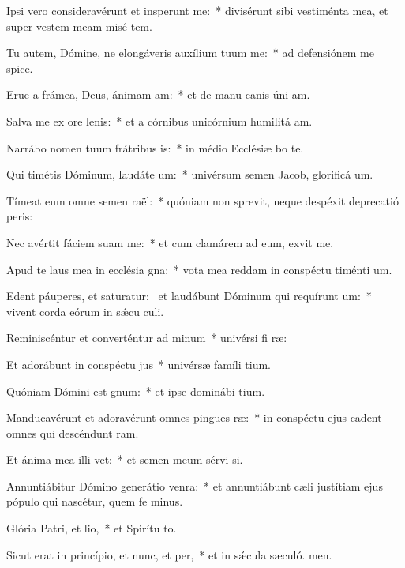 \item Ipsi vero consideravérunt et insperunt me:~* divisérunt sibi vestiménta mea, et super vestem meam misé tem.
\item Tu autem, Dómine, ne elongáveris auxílium tuum  me:~* ad defensiónem me spice.
\item Erue a frámea, Deus, ánimam am:~* et de manu canis úni am.
\item Salva me ex ore lenis:~* et a córnibus unicórnium humilitá am.
\item Narrábo nomen tuum frátribus is:~* in médio Ecclésiæ bo te.
\item Qui timétis Dóminum, laudáte um:~* univérsum semen Jacob, glorificá um.
\item Tímeat eum omne semen raël:~* quóniam non sprevit, neque despéxit deprecatió peris:
\item Nec avértit fáciem suam  me:~* et cum clamárem ad eum, exvit me.
\item Apud te laus mea in ecclésia gna:~* vota mea reddam in conspéctu timénti um.
\item Edent páuperes, et saturatur:~\pscross{} et laudábunt Dóminum qui requírunt um:~* vivent corda eórum in sǽcu culi.
\item Reminiscéntur et converténtur ad minum~* univérsi fi ræ:
\item Et adorábunt in conspéctu jus~* univérsæ famíli tium.
\item Quóniam Dómini est gnum:~* et ipse dominábi tium.
\item Manducavérunt et adoravérunt omnes pingues ræ:~* in conspéctu ejus cadent omnes qui descéndunt  ram.
\item Et ánima mea illi vet:~* et semen meum sérvi si.
\item Annuntiábitur Dómino generátio venra:~* et annuntiábunt cæli justítiam ejus pópulo qui nascétur, quem fe minus.
\item Glória Patri, et lio,~* et Spirítu to.
\item Sicut erat in princípio, et nunc, et per,~* et in sǽcula sæculó. men.
